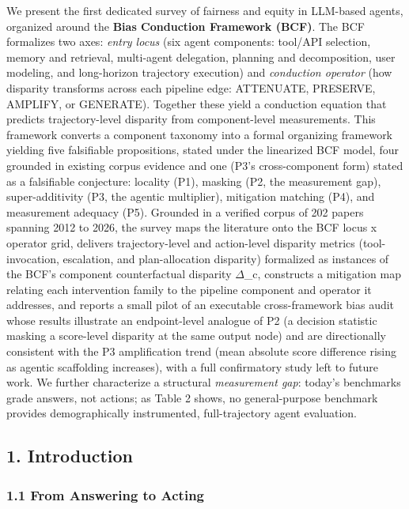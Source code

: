 \documentclass[10pt]{article}
\begin{document}
We present the first dedicated survey of fairness and equity in LLM-based agents, organized around the \textbf{Bias Conduction Framework (BCF)}. The BCF formalizes two axes: \emph{entry locus} (six agent components: tool/API selection, memory and retrieval, multi-agent delegation, planning and decomposition, user modeling, and long-horizon trajectory execution) and \emph{conduction operator} (how disparity transforms across each pipeline edge: ATTENUATE, PRESERVE, AMPLIFY, or GENERATE). Together these yield a conduction equation that predicts trajectory-level disparity from component-level measurements. This framework converts a component taxonomy into a formal organizing framework yielding five falsifiable propositions, stated under the linearized BCF model, four grounded in existing corpus evidence and one (P3's cross-component form) stated as a falsifiable conjecture: locality (P1), masking (P2, the measurement gap), super-additivity (P3, the agentic multiplier), mitigation matching (P4), and measurement adequacy (P5). Grounded in a verified corpus of 202 papers spanning 2012 to 2026, the survey maps the literature onto the BCF locus x operator grid, delivers trajectory-level and action-level disparity metrics (tool-invocation, escalation, and plan-allocation disparity) formalized as instances of the BCF's component counterfactual disparity $\Delta$\_c, constructs a mitigation map relating each intervention family to the pipeline component and operator it addresses, and reports a small pilot of an executable cross-framework bias audit whose results illustrate an endpoint-level analogue of P2 (a decision statistic masking a score-level disparity at the same output node) and are directionally consistent with the P3 amplification trend (mean absolute score difference rising as agentic scaffolding increases), with a full confirmatory study left to future work. We further characterize a structural \emph{measurement gap}: today's benchmarks grade answers, not actions; as Table 2 shows, no general-purpose benchmark provides demographically instrumented, full-trajectory agent evaluation.


\subsection*{1. Introduction}

\subsubsection*{1.1 From Answering to Acting}
\end{document}
